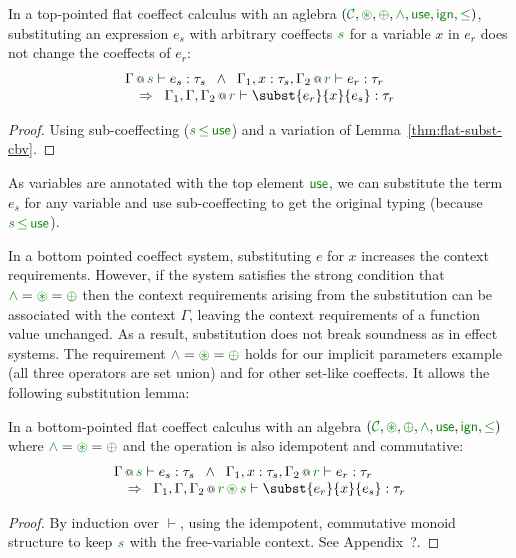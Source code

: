 \begin{lemma}
\label{thm:cbn-substitution-top}
In a top-pointed flat coeffect calculus with an aglebra $(\C, \cseq, \cpar, \czip, \cunit, \czero, \cleq)$,
substituting an expression $e_s$ with arbitrary coeffects $\cclrd{s}$ for a variable $x$ in $e_r$ does
not change the coeffects of $e_r$:
%
\begin{equation*}
\begin{array}{l}
 \coctx{\Gamma}{\cclrd{s}} \vdash e_s : \tau_s \;\; \wedge \;\; 
   \coctx{\Gamma_1,  x : \tau_s, \Gamma_2}{ \cclrd{r}  } \vdash e_r : \tau_r\\
 \quad \Rightarrow \;\; \coctx{\Gamma_1,\Gamma,\Gamma_2}{ \cclrd{r} } \vdash \subst{e_r}{x}{e_s} : \tau_r
\end{array}
\end{equation*}
\end{lemma}

\begin{proof}
Using sub-coeffecting ($\cclrd{s} \,\cleq\, \cunit$) and a variation of Lemma~\ref{thm:flat-subst-cbv}.
\end{proof}
%
\noindent
As variables are annotated with the top element $\cunit$, we can substitute the term $e_s$ 
for any variable and use sub-coeffecting to get the original typing (because
$\cclrd{s} \,\cleq\, \cunit$). 

In a bottom pointed coeffect system, substituting $e$ for $x$ increases the context 
requirements. However, if the system satisfies the strong condition that $\czip = \cseq = \cpar$ 
then the context requirements arising from the substitution can be associated with the context
$\Gamma$, leaving the context requirements of a function value unchanged. As a result, substitution 
does not break soundness as in effect systems. The requirement $\czip = \cseq = \cpar$ holds for 
our implicit parameters example (all three operators are set union) and for other set-like 
coeffects. It allows the following substitution lemma:

\begin{lemma}
\label{thm:cbn-substitution-bot}
In a bottom-pointed flat coeffect calculus with an algebra $(\C, \cseq, \cpar, \czip, \cunit, \czero, \cleq)$ 
where $\czip = \cseq = \cpar$ and the operation is also idempotent and commutative:
%
\begin{equation*}
\begin{array}{l}
\coctx{\Gamma}{\cclrd{s}} \vdash e_s : \tau_s \;\; \wedge \;\; 
\coctx{\Gamma_1,  x : \tau_s, \Gamma_2}{ \cclrd{r}  } \vdash e_r : \tau_r\\
\quad \Rightarrow \;\; \coctx{\Gamma_1,\Gamma,\Gamma_2}{ \cclrd{r} \,\cseq\, \cclrd{s} } \vdash \subst{e_r}{x}{e_s} : \tau_r
\end{array}
\end{equation*}

\end{lemma}
\begin{proof}
By induction over $\vdash$, using the idempotent, commutative monoid structure to keep $\cclrd{s}$ with
the free-variable context. See Appendix~?.
\end{proof}

